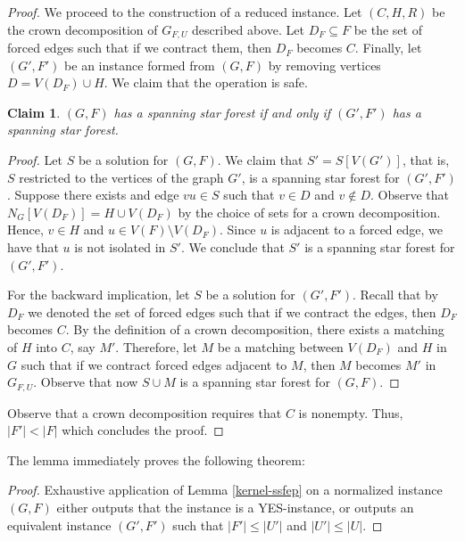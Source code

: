 \documentclass[en]{pracamgr}
\newtheorem{claim}{Claim}
\theoremstyle{definition}
\begin{document}
\begin{proof}
	We proceed to the construction of a reduced instance. Let $(C,H,R)$ be the crown decomposition of $G_{F,U}$ described above. Let $D_F \subseteq F$ be the set of forced edges such that if we contract them, then $D_F$ becomes $C$. Finally, let $(G',F')$ be an instance formed from $(G,F)$ by removing vertices $D=V(D_F) \cup H$. We claim that the operation is safe.
	
	\begin{claim}
		$(G,F)$ has a spanning star forest if and only if $(G',F')$ has a spanning star forest.
	\end{claim}
	\begin{proof}		
		Let $S$ be a solution for $(G,F)$. We claim that $S' = S[V(G')]$, that is, $S$ restricted to the vertices of the graph $G'$, is a spanning star forest for $(G',F')$. Suppose there exists and edge $vu \in S$ such that $v \in D$ and $v \notin D$. Observe that $N_G[V(D_F)] = H \cup V(D_F)$ by the choice of sets for a crown decomposition. Hence, $v \in H$ and $u \in V(F) \setminus V(D_F)$. Since $u$ is adjacent to a forced edge, we have that $u$ is not isolated in $S'$. We conclude that $S'$ is a spanning star forest for $(G',F')$.
		
		For the backward implication, let $S$ be a solution for $(G',F')$. Recall that by $D_F$ we denoted the set of forced edges such that if we contract the edges, then $D_F$ becomes $C$. By the definition of a crown decomposition, there exists a matching of $H$ into $C$, say $M'$. Therefore, let $M$ be a matching between $V(D_F)$ and $H$ in $G$ such that if we contract forced edges adjacent to $M$, then $M$ becomes $M'$ in $G_{F,U}$. Observe that now $S \cup M$ is a spanning star forest for $(G,F)$.
	\end{proof}
	
	Observe that a crown decomposition requires that $C$ is nonempty. Thus, $|F'| < |F|$ which concludes the proof. \qedhere
	
\end{proof}

The lemma immediately proves the following theorem:

\thmssfepkernel*

\begin{proof}
	Exhaustive application of Lemma \ref{kernel-ssfep} on a normalized instance $(G,F)$ either outputs that the instance is a YES-instance, or outputs an equivalent instance $(G',F')$ such that $|F'| \leq |U'|$ and $|U'| \leq |U|$.
\end{proof}
\end{document}
